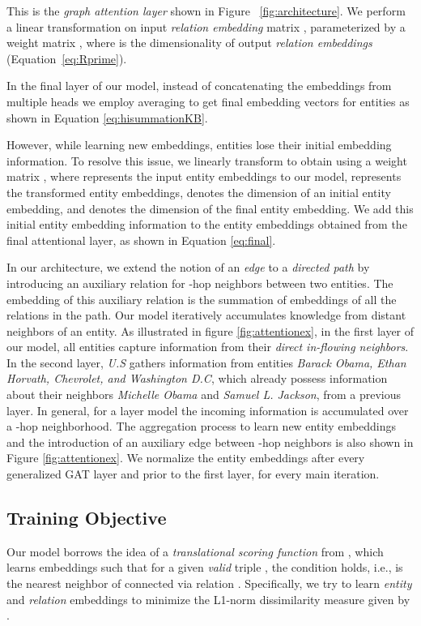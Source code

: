 \documentclass[11pt,a4paper]{article}
\begin{document}
This is the \emph{graph attention layer} shown in Figure ~\ref{fig:architecture}.
We perform a linear transformation on input \emph{relation embedding} matrix , parameterized by a weight matrix , where  is the dimensionality of output \emph{relation embeddings} (Equation~\ref{eq:Rprime}).

In the final layer of our model, instead of concatenating the embeddings from multiple heads we employ averaging to get final embedding vectors for entities as shown in Equation \ref{eq:hisummationKB}.

However, while learning new embeddings, entities lose their initial embedding information. To resolve this issue, we linearly transform  to obtain  using a weight matrix , where  represents the input entity embeddings to our model,  represents the transformed entity embeddings,  denotes the dimension of an initial entity embedding, and  denotes the dimension of the final entity embedding. We add this initial entity embedding information to the entity embeddings obtained from the final attentional layer,  as shown in Equation \ref{eq:final}.

In our architecture, we extend the notion of an \emph{edge} to a \emph{directed path}
by introducing an auxiliary relation for -hop neighbors between two entities. 
The embedding of this auxiliary relation is the summation of embeddings of all the relations in the path.
Our model iteratively accumulates knowledge from distant neighbors of an entity. As illustrated in figure \ref{fig:attentionex}, in the first layer of our model, all entities capture information from their \emph{direct in-flowing neighbors}. In the second layer, \textit{U.S} gathers information from entities \textit{Barack Obama, Ethan Horvath, Chevrolet, and Washington D.C}, which already possess information about their neighbors \textit{Michelle Obama} and \textit{Samuel L. Jackson}, from a previous layer. In general, for a  layer model the incoming information is accumulated over a -hop neighborhood. The aggregation process to learn new entity embeddings and the introduction of an auxiliary edge between -hop neighbors is also shown in Figure \ref{fig:attentionex}. We normalize the entity embeddings after every generalized GAT layer and prior to the first layer, for every main iteration.

\subsection{Training Objective}
Our model borrows the idea of a \emph{translational scoring function} from \cite{NIPS2013_5071}, which learns embeddings such that for a given \emph{valid} triple , the condition   holds, i.e.,  is the nearest neighbor of  connected via relation . 
Specifically, we try to learn \emph{entity} and \emph{relation} embeddings to minimize the L1-norm dissimilarity measure given by . 
\end{document}
